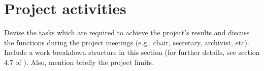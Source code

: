 \chapter{Project activities  } Devise the tasks which are required to achieve the project’s  results and discuss the functions during the project meetings (e.g., chair, secretary, archivist, etc). Include a work breakdown structure in this section (for further details, see section 4.7 of \cite{Grit}). Also, mention briefly the project limits. 
